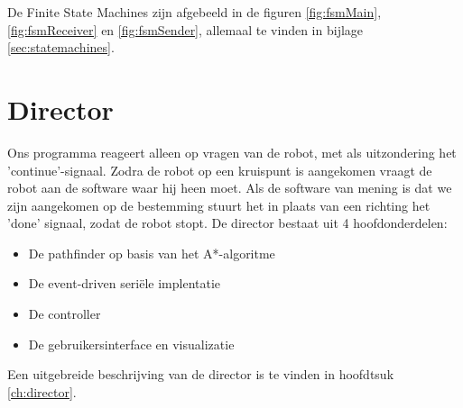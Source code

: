\documentclass{report}
\begin{document}
De Finite State Machines zijn afgebeeld in de figuren \ref{fig:fsmMain}, \ref{fig:fsmReceiver} en \ref{fig:fsmSender}, allemaal te vinden in bijlage \ref{sec:statemachines}.

\section{Director}
Ons programma reageert alleen op vragen van de robot, met als uitzondering het 'continue'-signaal.
Zodra de robot op een kruispunt is aangekomen vraagt de robot aan de software waar hij heen moet.
Als de software van mening is dat we zijn aangekomen op de bestemming stuurt het in plaats van een richting het 'done' signaal, zodat de robot stopt.
De director bestaat uit 4 hoofdonderdelen:

\begin{itemize}
	\item De pathfinder op basis van het A*-algoritme
	\item De event-driven seriële implentatie
	\item De controller
	\item De gebruikersinterface en visualizatie
\end{itemize}

Een uitgebreide beschrijving van de director is te vinden in hoofdtsuk \ref{ch:director}.
\end{document}
